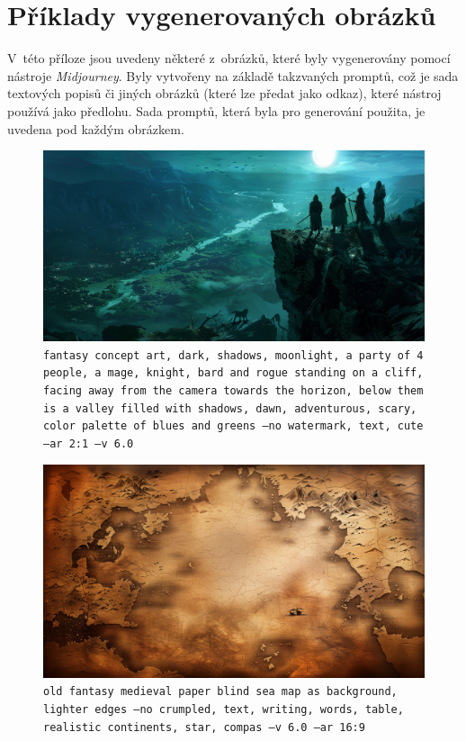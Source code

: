 \chapter{Příklady vygenerovaných obrázků}

V~této příloze jsou uvedeny některé z~obrázků, které byly vygenerovány pomocí nástroje \textit{Midjourney}. Byly vytvořeny na základě takzvaných promptů, což je sada textových popisů či jiných obrázků (které lze předat jako odkaz), které nástroj používá jako předlohu. Sada promptů, která byla pro generování použita, je uvedena pod každým obrázkem.

\begin{figure}
    \centering
    \includegraphics[width=\textwidth]{resources/figures/theme.png}
    \caption{\texttt{fantasy concept art, dark, shadows, moonlight, a party of 4 people, a mage, knight, bard and rogue standing on a cliff, facing away from the camera towards the horizon, below them is a valley filled with shadows, dawn, adventurous, scary, color palette of blues and greens --no watermark, text, cute --ar 2:1 --v 6.0}}
    \label{fig:theme}
\end{figure}

\begin{figure}
    \centering
    \includegraphics[width=\textwidth]{resources/figures/map.png}
    \caption{\texttt{old fantasy medieval paper blind sea map as background, lighter edges --no crumpled, text, writing, words, table, realistic continents, star, compas --v 6.0 --ar 16:9}}
    \label{fig:map}
\end{figure}

